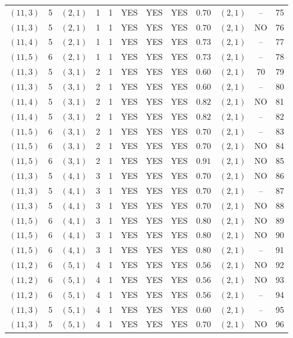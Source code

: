 \begin{longtable}{|c|c|c|c|c|c|c|c|c|c|c|c|}
$(11,3)$ & 5 & $(2,1)$ & 1 & 1 & YES & YES & YES & $0.70$ & $(2,1)$ & -- & 75\\
$(11,3)$ & 5 & $(2,1)$ & 1 & 1 & YES & YES & YES & $0.70$ & $(2,1)$ & NO & 76\\
$(11,4)$ & 5 & $(2,1)$ & 1 & 1 & YES & YES & YES & $0.73$ & $(2,1)$ & -- & 77\\
$(11,5)$ & 6 & $(2,1)$ & 1 & 1 & YES & YES & YES & $0.73$ & $(2,1)$ & -- & 78\\
$(11,3)$ & 5 & $(3,1)$ & 2 & 1 & YES & YES & YES & $0.60$ & $(2,1)$ & 70 & 79\\
$(11,3)$ & 5 & $(3,1)$ & 2 & 1 & YES & YES & YES & $0.60$ & $(2,1)$ & -- & 80\\
$(11,4)$ & 5 & $(3,1)$ & 2 & 1 & YES & YES & YES & $0.82$ & $(2,1)$ & NO & 81\\
$(11,4)$ & 5 & $(3,1)$ & 2 & 1 & YES & YES & YES & $0.82$ & $(2,1)$ & -- & 82\\
$(11,5)$ & 6 & $(3,1)$ & 2 & 1 & YES & YES & YES & $0.70$ & $(2,1)$ & -- & 83\\
$(11,5)$ & 6 & $(3,1)$ & 2 & 1 & YES & YES & YES & $0.70$ & $(2,1)$ & NO & 84\\
$(11,5)$ & 6 & $(3,1)$ & 2 & 1 & YES & YES & YES & $0.91$ & $(2,1)$ & NO & 85\\
$(11,3)$ & 5 & $(4,1)$ & 3 & 1 & YES & YES & YES & $0.70$ & $(2,1)$ & NO & 86\\
$(11,3)$ & 5 & $(4,1)$ & 3 & 1 & YES & YES & YES & $0.70$ & $(2,1)$ & -- & 87\\
$(11,3)$ & 5 & $(4,1)$ & 3 & 1 & YES & YES & YES & $0.70$ & $(2,1)$ & NO & 88\\
$(11,5)$ & 6 & $(4,1)$ & 3 & 1 & YES & YES & YES & $0.80$ & $(2,1)$ & NO & 89\\
$(11,5)$ & 6 & $(4,1)$ & 3 & 1 & YES & YES & YES & $0.80$ & $(2,1)$ & NO & 90\\
$(11,5)$ & 6 & $(4,1)$ & 3 & 1 & YES & YES & YES & $0.80$ & $(2,1)$ & -- & 91\\
$(11,2)$ & 6 & $(5,1)$ & 4 & 1 & YES & YES & YES & $0.56$ & $(2,1)$ & NO & 92\\
$(11,2)$ & 6 & $(5,1)$ & 4 & 1 & YES & YES & YES & $0.56$ & $(2,1)$ & NO & 93\\
$(11,2)$ & 6 & $(5,1)$ & 4 & 1 & YES & YES & YES & $0.56$ & $(2,1)$ & -- & 94\\
$(11,3)$ & 5 & $(5,1)$ & 4 & 1 & YES & YES & YES & $0.60$ & $(2,1)$ & -- & 95\\
$(11,3)$ & 5 & $(5,1)$ & 4 & 1 & YES & YES & YES & $0.70$ & $(2,1)$ & NO & 96\\

\end{longtable}
